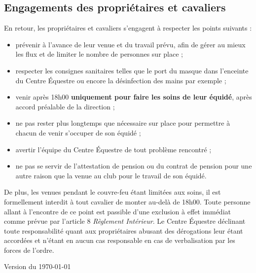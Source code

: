 \documentclass[11pt,a4paper]{article}
\begin{document}
	\subsection*{Engagements des propriétaires et cavaliers}
		En retour, les propriétaires et cavaliers s'engagent à respecter les points suivants :
		\begin{itemize}
			\item prévenir à l'avance de leur venue et du travail prévu, afin de gérer au mieux les flux et de limiter le nombre de personnes sur place ;
			\item respecter les consignes sanitaires telles que le port du masque dans l'enceinte du Centre Équestre ou encore la désinfection des mains par exemple ;
			\item venir après 18h00 \textbf{uniquement pour faire les soins de leur équidé}, après accord préalable de la direction ;
			\item ne pas rester plus longtemps que nécessaire sur place pour permettre à chacun de venir s'occuper de son équidé ;
			\item avertir l'équipe du Centre Équestre de tout problème rencontré ;
			\item ne pas se servir de l'attestation de pension ou du contrat de pension pour une autre raison que la venue au club pour le travail de son équidé.
		\end{itemize}

		De plus, les venues pendant le couvre-feu étant limitées aux soins, il est formellement interdit à tout cavalier de monter au-delà de 18h00. Toute personne allant à l'encontre de ce point est passible d'une exclusion à effet immédiat comme prévue par l'article 8 \textit{Règlement Intérieur}. Le Centre Équestre déclinant toute responsabilité quant aux propriétaires abusant des dérogations leur étant accordées et n'étant en aucun cas responsable en cas de verbalisation par les forces de l'ordre.


\vfill
\begin{flushright}
	Version du \today
\end{flushright}
\end{document}
